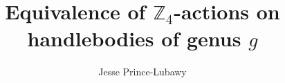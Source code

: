 \documentclass{amsart}
\theoremstyle{definition}
\numberwithin{equation}{section}
\begin{document}
\vspace{0.5in}


\renewcommand{\bf}{\bfseries}
\renewcommand{\sc}{\scshape}
\vspace{0.5in}


\title{Equivalence of $\mathbb{Z}_{4}$-actions on handlebodies of genus $g$}

\author{Jesse Prince-Lubawy}
\address{Department of Mathematics\\
University of North Alabama\\
Florence, AL 35632}





\end{document}

